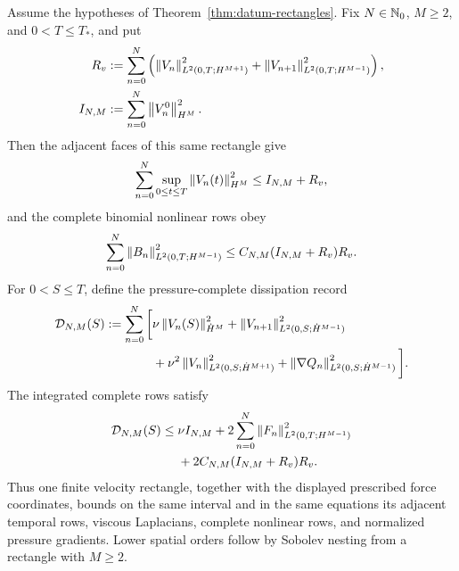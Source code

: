 \begin{proposition}
\label{prop:rectangle-bounds-complete-rows}
Assume the hypotheses of Theorem~\ref{thm:datum-rectangles}.  Fix
\(N\in\mathbb N_0\), \(M\ge2\), and \(0<T\le T_*\), and put
\begin{align*}
 R_v&:=\sum_{n=0}^N\left(
 \left\lVert V_n\right\rVert_{L^2(0,T;H^{M+1})}^2
 +\left\lVert V_{n+1}\right\rVert_{L^2(0,T;H^{M-1})}^2\right),\\
 I_{N,M}&:=\sum_{n=0}^N\left\lVert V_n^0\right\rVert_{H^M}^2.
\end{align*}
Then the adjacent faces of this same rectangle give
\begin{equation}
 \sum_{n=0}^N\sup_{0\le t\le T}\left\lVert V_n(t)\right\rVert_{H^M}^2
 \le I_{N,M}+R_v,
 \label{eq:rectangle-adjacent-trace-bound}
\end{equation}
and the complete binomial nonlinear rows obey
\begin{equation}
 \sum_{n=0}^N\left\lVert B_n\right\rVert_{L^2(0,T;H^{M-1})}^2
 \le C_{N,M}(I_{N,M}+R_v)R_v.
 \label{eq:rectangle-complete-binomial-bound}
\end{equation}
For \(0<S\le T\), define the pressure-complete dissipation record
\begin{align*}
 \mathcal D_{N,M}(S):=\sum_{n=0}^N\bigg[&
 \nu\left\lVert V_n(S)\right\rVert_{\dot H^M}^2
 +\left\lVert V_{n+1}\right\rVert_{L^2(0,S;\dot H^{M-1})}^2\\
 &+\nu^2\left\lVert V_n\right\rVert_{L^2(0,S;\dot H^{M+1})}^2
 +\left\lVert \nabla Q_n\right\rVert_{L^2(0,S;\dot H^{M-1})}^2\bigg].
\end{align*}
The integrated complete rows satisfy
\begin{align}
 \mathcal D_{N,M}(S)
 \le{}&\nu I_{N,M}
 +2\sum_{n=0}^N\left\lVert F_n\right\rVert_{L^2(0,T;H^{M-1})}^2
 \notag\\
 &+2C_{N,M}(I_{N,M}+R_v)R_v.
 \label{eq:rectangle-complete-row-bound}
\end{align}
Thus one finite velocity rectangle, together with the displayed prescribed
force coordinates, bounds on the same interval and in the same equations its
adjacent temporal rows, viscous Laplacians, complete nonlinear rows, and
normalized pressure gradients.  Lower spatial orders follow by Sobolev nesting
from a rectangle with \(M\ge2\).
\end{proposition}

